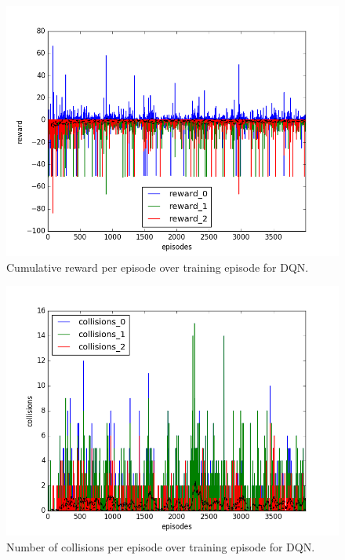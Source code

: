 \begin{figure}[h]
  \centering
  \includegraphics[trim=10 10 10 10,clip,width=\figscale\linewidth]
  {../results/dqn_2vs1/reward.png}
  \caption{Cumulative reward per episode over training episode for DQN.}
  \label{fig:dqn-2vs1}
\end{figure}
\FloatBarrier


\begin{figure}[h]
  \centering
  \includegraphics[trim=10 10 10 10,clip,width=\figscale\linewidth]
  {../results/dqn_2vs1/collisions.png}
  \caption{Number of collisions per episode over training episode for DQN.}
  \label{fig:dqn-2vs1}
\end{figure}
\FloatBarrier


